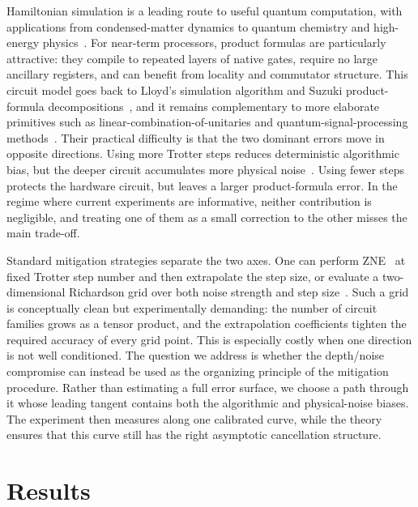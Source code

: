 \documentclass[aps,pra,reprint,superscriptaddress]{revtex4-2}
\begin{document}
\noindent Hamiltonian simulation is a leading route to useful quantum computation, with applications from condensed-matter dynamics to quantum chemistry and high-energy physics~\cite{kim2023evidence,childs2018toward,mcardle2020quantum,bauer2023quantum}.
For near-term processors, product formulas are particularly attractive: they compile to repeated layers of native gates, require no large ancillary registers, and can benefit from locality and commutator structure.
This circuit model goes back to Lloyd's simulation algorithm and Suzuki product-formula decompositions~\cite{doi:10.1126/science.273.5278.1073,suzuki1985decomposition,suzuki1991general}, and it remains complementary to more elaborate primitives such as linear-combination-of-unitaries and quantum-signal-processing methods~\cite{childs2012hamiltonian,dominic_w_berry_simulating_2015,Low_2017,low2019hamiltonian}.
Their practical difficulty is that the two dominant errors move in opposite directions.
Using more Trotter steps reduces deterministic algorithmic bias, but the deeper circuit accumulates more physical noise~\cite{xu2025exponentiallydecayingquantumsimulation}.
Using fewer steps protects the hardware circuit, but leaves a larger product-formula error.
In the regime where current experiments are informative, neither contribution is negligible, and treating one of them as a small correction to the other misses the main trade-off.

Standard mitigation strategies separate the two axes.
One can perform ZNE~\cite{li2017efficient,PhysRevLett.119.180509} at fixed Trotter step number and then extrapolate the step size, or evaluate a two-dimensional Richardson grid over both noise strength and step size~\cite{vazquez2023well,hakkaku2025dataefficienterrormitigationphysical}.
Such a grid is conceptually clean but experimentally demanding: the number of circuit families grows as a tensor product, and the extrapolation coefficients tighten the required accuracy of every grid point.
This is especially costly when one direction is not well conditioned.
The question we address is whether the depth/noise compromise can instead be used as the organizing principle of the mitigation procedure.
Rather than estimating a full error surface, we choose a path through it whose leading tangent contains both the algorithmic and physical-noise biases.
The experiment then measures along one calibrated curve, while the theory ensures that this curve still has the right asymptotic cancellation structure.

\section{Results}
\end{document}
